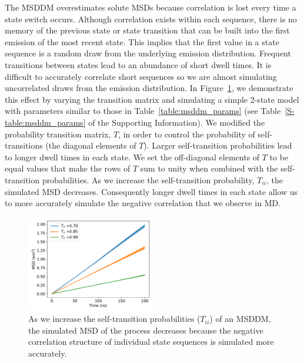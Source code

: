 \documentclass{article}
\begin{document}
  The MSDDM overestimates solute MSDs because correlation is lost
  every time a state switch occurs. Although correlation exists within each
  sequence, there is no memory of the previous state or state transition 
  that can be built into the first emission of the most recent state. 
  This implies that the first value in a state sequence is a random
  draw from the underlying emission distribution. Frequent transitions
  between states lead to an abundance of short dwell times. It is 
  difficult to accurately correlate short sequences so we are 
  almost simulating uncorrelated draws from the emission distribution.
  In Figure~\ref{fig:T_sensitivity}, we demonstrate this effect by varying 
  the transition matrix and simulating a simple 2-state model with parameters
  similar to those in Table~\ref{table:msddm_params} (see Table~\ref{S-table:msddm_params}
  of the Supporting Information). We modified the probability
  transition matrix, $T$, in order to control the probability of 
  self-transitions (the diagonal elements of $T$). Larger self-transition probabilities lead to longer dwell 
  times in each state. We set the off-diagonal elements of $T$ to be equal values that make the
  rows of $T$ sum to unity when combined with the self-transition probabilities. 
  As we increase the self-transition probability, $T_{ii}$, the simulated MSD 
  decreases. Consequently longer dwell times in each state allow us to more accurately
  simulate the negative correlation that we observe in MD.
  
  \begin{figure}
  \centering
  \includegraphics[width=0.5\textwidth]{T_sensitivity.pdf}
  \caption{As we increase the self-transition probabilities ($T_{ii}$) of an MSDDM,
  the simulated MSD of the process decreases because the negative correlation structure
  of individual state sequences is simulated more accurately.}\label{fig:T_sensitivity}
  \end{figure}
  
\end{document}
